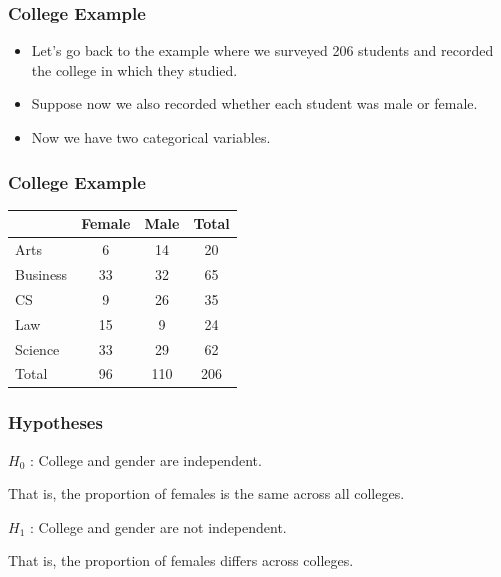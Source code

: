 \documentclass[12pt]{beamer}
\begin{document}
\begin{frame}
	\frametitle{College Example}
	
	\begin{itemize}[label={\color{blue}$\blacktriangleright$}]
		\item Let's go back to the example where we surveyed 206 students and recorded the college in which they studied.
		
		\item Suppose now we also recorded whether each student was male or female.
		
		\item Now we have two categorical variables.
	\end{itemize}
	
\end{frame}
\begin{frame}
	\frametitle{College Example}
	
	\begin{center}
		\begin{tabular}{lccc}
			\toprule
			& Female & Male & Total \\
			\midrule
			Arts & 6 & 14 & 20 \\
			Business & 33 & 32 & 65 \\
			CS & 9 & 26 & 35 \\
			Law & 15 & 9 & 24 \\
			Science & 33 & 29 & 62 \\
			\midrule
			Total & 96 & 110 & 206 \\
			\bottomrule
		\end{tabular}
	\end{center}
	
\end{frame}
\begin{frame}
	\frametitle{Hypotheses}
	
	$H_0$ : College and gender are independent.
	\medskip
	
	\hspace*{2em}That is, the proportion of females is the same across all colleges.
	
	\bigskip
	
	$H_1$ : College and gender are not independent.
	\medskip
	
	\hspace*{2em}That is, the proportion of females differs across colleges.
	
\end{frame}
\end{document}
